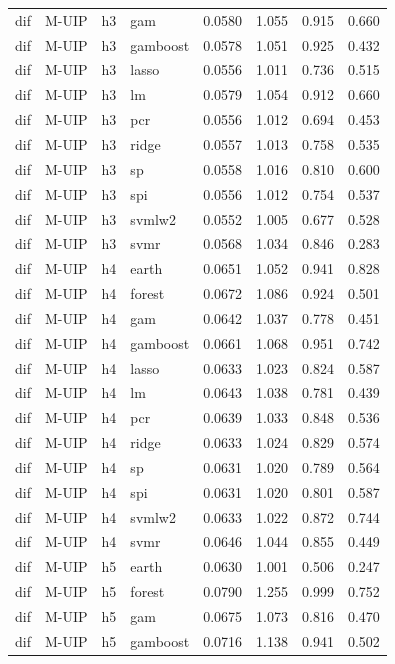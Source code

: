 \begin{ThreePartTable}
\begin{longtable}[t]{llclcccc}
dif & M-UIP & h3 & gam & 0.0580 & 1.055 & 0.915 & 0.660\\
dif & M-UIP & h3 & gamboost & 0.0578 & 1.051 & 0.925 & 0.432\\
dif & M-UIP & h3 & lasso & 0.0556 & 1.011 & 0.736 & 0.515\\
dif & M-UIP & h3 & lm & 0.0579 & 1.054 & 0.912 & 0.660\\
dif & M-UIP & h3 & pcr & 0.0556 & 1.012 & 0.694 & 0.453\\
dif & M-UIP & h3 & ridge & 0.0557 & 1.013 & 0.758 & 0.535\\
dif & M-UIP & h3 & sp & 0.0558 & 1.016 & 0.810 & 0.600\\
dif & M-UIP & h3 & spi & 0.0556 & 1.012 & 0.754 & 0.537\\
dif & M-UIP & h3 & svmlw2 & 0.0552 & 1.005 & 0.677 & 0.528\\
dif & M-UIP & h3 & svmr & 0.0568 & 1.034 & 0.846 & 0.283\\
\addlinespace
dif & M-UIP & h4 & earth & 0.0651 & 1.052 & 0.941 & 0.828\\
dif & M-UIP & h4 & forest & 0.0672 & 1.086 & 0.924 & 0.501\\
dif & M-UIP & h4 & gam & 0.0642 & 1.037 & 0.778 & 0.451\\
dif & M-UIP & h4 & gamboost & 0.0661 & 1.068 & 0.951 & 0.742\\
dif & M-UIP & h4 & lasso & 0.0633 & 1.023 & 0.824 & 0.587\\
dif & M-UIP & h4 & lm & 0.0643 & 1.038 & 0.781 & 0.439\\
dif & M-UIP & h4 & pcr & 0.0639 & 1.033 & 0.848 & 0.536\\
dif & M-UIP & h4 & ridge & 0.0633 & 1.024 & 0.829 & 0.574\\
dif & M-UIP & h4 & sp & 0.0631 & 1.020 & 0.789 & 0.564\\
dif & M-UIP & h4 & spi & 0.0631 & 1.020 & 0.801 & 0.587\\
dif & M-UIP & h4 & svmlw2 & 0.0633 & 1.022 & 0.872 & 0.744\\
dif & M-UIP & h4 & svmr & 0.0646 & 1.044 & 0.855 & 0.449\\
\addlinespace
dif & M-UIP & h5 & earth & 0.0630 & 1.001 & 0.506 & 0.247\\
dif & M-UIP & h5 & forest & 0.0790 & 1.255 & 0.999 & 0.752\\
dif & M-UIP & h5 & gam & 0.0675 & 1.073 & 0.816 & 0.470\\
dif & M-UIP & h5 & gamboost & 0.0716 & 1.138 & 0.941 & 0.502\\

\end{longtable}
\end{ThreePartTable}
